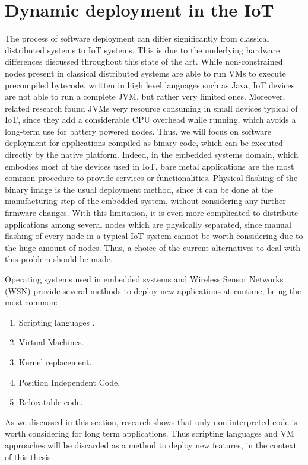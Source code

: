 \section{Dynamic deployment in the IoT}
\label{sec:IoTDeployment}
The process of software deployment can differ significantly from classical distributed systems to IoT systems.
This is due to the underlying hardware differences discussed throughout this state of the art.
While non-constrained nodes present in classical distributed systems are able to run VMs to execute precompiled bytecode, written in high level languages such as Java, IoT devices are not able to run a complete JVM, but rather very limited ones\cite{levis2002mate}\cite{brouwers2009darjeeling}.
Moreover, related research\cite{oliver2014reprogramming} found JVMs very resource consuming in small devices typical of IoT, since they add a considerable CPU overhead while running, which avoids a long-term use for battery powered nodes.
Thus, we will focus on software deployment for applications compiled as binary code, which can be executed directly by the native platform.
Indeed, in the embedded systems domain, which embodies most of the devices used in IoT, bare metal applications are the most common procedure to provide services or functionalities.
Physical flashing of the binary image is the usual deployment method, since it can be done at the manufacturing step of the embedded system, without considering any further firmware changes.
With this limitation, it is even more complicated to distribute applications among several nodes which are physically separated, since manual flashing of every node in a typical IoT system cannot be worth considering due to the huge amount of nodes.
Thus, a choice of the current alternatives to deal with this problem should be made.

Operating systems used in embedded systems and Wireless Sensor Networks (WSN) provide several methods to deploy new applications at runtime, being the most common:
\begin{enumerate}
	\item Scripting languages \cite{dunkels2006low}\cite{kovatsch2012actinium}.
	\item Virtual Machines.
	\item Kernel replacement.
	\item Position Independent Code.
	\item Relocatable code.
\end{enumerate}
As we discussed in this section, research shows that only non-interpreted code is worth considering for long term applications.
Thus scripting languages and VM approaches will be discarded as a method to deploy new features, in the context of this thesis.

